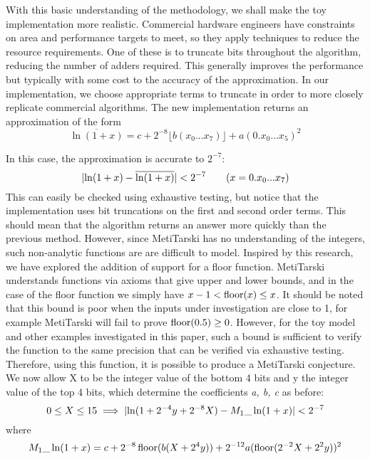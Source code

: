 With this basic understanding of the methodology, we shall make the toy implementation more realistic. Commercial hardware engineers have constraints on area and performance targets to meet, so they apply techniques to reduce the resource requirements. One of these is to truncate bits throughout the algorithm, reducing the number of adders required. This generally improves the performance but typically with some cost to the accuracy of the approximation. In our implementation, we choose appropriate terms to truncate in order to more closely replicate commercial algorithms. The new implementation returns an approximation of the form 
$$ \overline{\ln(1+x)}=c + 2^{-8} \lfloor{b(x_0...x_7)} \rfloor +a(0.x_0...x_5)^2 $$

\noindent In this case, the approximation is accurate to $2^{-7}$: 
\[ 
\lvert\ln(1+x)-\overline{\ln(1+x)}\rvert <2^{-7} \qquad (x= 0.x_0...x_7) \]
This can easily be checked using exhaustive testing, but notice that the implementation uses bit truncations on the first and second order terms. This should mean that the algorithm returns an answer more quickly than the previous method. However, since MetiTarski has no understanding of the integers, such non-analytic functions are are difficult to model. Inspired by this research, we have explored the addition of support for a floor function. MetiTarski understands functions via axioms that give upper and lower bounds, and in the case of the floor function we simply have $x-1< \mathop{\textrm{floor}}\nolimits(x)\le x$. It should be noted that this bound is poor when the inputs under investigation are close to 1, for example MetiTarski will fail to prove $\mathop{\textrm{floor}}\nolimits(0.5)\geq 0$.
However, for the toy model and other examples investigated in this paper, such a bound is sufficient to verify the function to the same precision that can be verified via exhaustive testing. Therefore, using this function, it is possible to produce a MetiTarski conjecture. We now allow X to be the integer value of the bottom 4 bits and y the integer value of the top 4 bits, which determine the coefficients \textit{a, b, c} as before:
\[
0\le X \le 15 \implies \lvert\ln(1+2^{-4}y+2^{-8}X) - M_1\_\ln(1+x)\rvert <2^{-7}
\]
where $$M_1\_\ln(1+x)=c+2^{-8}\mathop{\textrm{floor}}\nolimits(b(X+2^{4}y))+2^{-12}a(\mathop{\textrm{floor}}\nolimits(2^{-2}X+2^{2}y))^2$$

